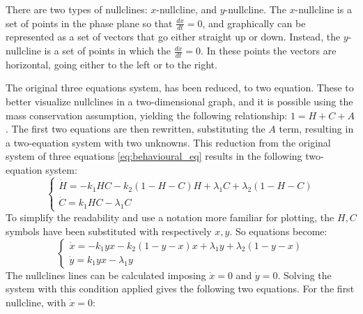There are two types of nullclines: $x$-nullcline, and $y$-nullcline. The $x$-nullcline is a set of points in the phase plane so that $\frac{dx}{dt} =0$, and graphically can be represented as a set of vectors that go either straight up or down. Instead, the $y$-nullcline is a set of points in which the $\frac{dx}{dt} =0$. In these points the vectors are horizontal, going either to the left or to the right.

The original three equations system, has been reduced, to two equation. These to better visualize nullclines in a two-dimensional graph, and it is possible using the mass conservation assumption, yielding the following relationship: $1=H+C+A$. The first two equations are then rewritten, substituting the $A$ term, resulting in a two-equation system with two unknowns. This reduction from the original system of three equations \ref{eq:behavioural_eq}  results in the following two-equation system:
\[
\begin{cases}
	\dot{H} = -k_1 H C - k_2 (1-H-C) H + \lambda_1 C + \lambda_2 (1-H-C)\\
	\dot{C} = k_1 H C - \lambda_1 C
\end{cases}
\]
To simplify the readability and use a notation more familiar for plotting, the $H, C$ symbols have been substituted with respectively $x, y$. So equations become:
\begin{equation}
\label{eq:system_nullclines}
\begin{cases}
	\dot{x} = -k_1 y x - k_2 (1-y-x) x + \lambda_1 y + \lambda_2 (1-y-x)\\
	\dot{y} = k_1 y x - \lambda_1 y
\end{cases}
\end{equation}
The nullclines lines can be calculated imposing $\dot{x} = 0$ and $\dot{y} = 0$. Solving the system with this condition applied gives the following two equations. For the first nullcline, with $\dot{x} = 0$:

